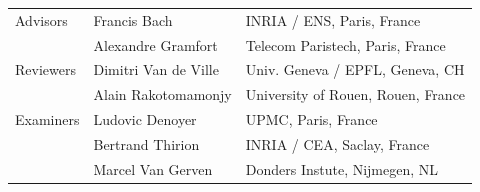 \documentclass[nobib, a4paper, notoc, twoside, justified]{tufte-book}
\begin{document}
\begin{titlepage}
\begin{fullwidth}
\begin{center}
{\LARGE
\begin{tabular}{lll}
\vspace{1pc}
{Advisors} & Francis Bach &  INRIA / ENS, Paris, France \\
\vspace{1pc}
& Alexandre Gramfort & Telecom Paristech, Paris, France\\
\vspace{1pc}
{Reviewers} & Dimitri Van de Ville  & Univ. Geneva / EPFL,  Geneva, CH \\
\vspace{1pc}
 &Alain Rakotomamonjy  & University of Rouen, Rouen, France \\
\vspace{1pc}
{Examiners} & Ludovic Denoyer & UPMC, Paris, France \\
\vspace{1pc}
& Bertrand Thirion & INRIA / CEA, Saclay, France \\
\vspace{1pc}
 & Marcel Van Gerven & Donders Instute, Nijmegen, NL \\
\end{tabular}
}


\end{center}
\end{fullwidth}
\end{titlepage}
\end{document}
